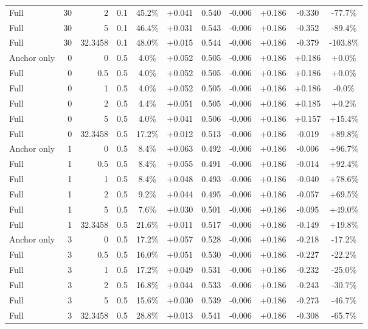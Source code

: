 \begin{table}[htbp]
\begin{tabular}{lrrrccccccc}
Full & 30 & 2 & 0.1 & 45.2\% & +0.041 & 0.540 & -0.006 & +0.186 & -0.330 & -77.7\% \\
Full & 30 & 5 & 0.1 & 46.4\% & +0.031 & 0.543 & -0.006 & +0.186 & -0.352 & -89.4\% \\
Full & 30 & 32.3458 & 0.1 & 48.0\% & +0.015 & 0.544 & -0.006 & +0.186 & -0.379 & -103.8\% \\
Anchor only & 0 & 0 & 0.5 & 4.0\% & +0.052 & 0.505 & -0.006 & +0.186 & +0.186 & +0.0\% \\
Full & 0 & 0.5 & 0.5 & 4.0\% & +0.052 & 0.505 & -0.006 & +0.186 & +0.186 & +0.0\% \\
Full & 0 & 1 & 0.5 & 4.0\% & +0.052 & 0.505 & -0.006 & +0.186 & +0.186 & -0.0\% \\
Full & 0 & 2 & 0.5 & 4.4\% & +0.051 & 0.505 & -0.006 & +0.186 & +0.185 & +0.2\% \\
Full & 0 & 5 & 0.5 & 4.0\% & +0.041 & 0.506 & -0.006 & +0.186 & +0.157 & +15.4\% \\
Full & 0 & 32.3458 & 0.5 & 17.2\% & +0.012 & 0.513 & -0.006 & +0.186 & -0.019 & +89.8\% \\
Anchor only & 1 & 0 & 0.5 & 8.4\% & +0.063 & 0.492 & -0.006 & +0.186 & -0.006 & +96.7\% \\
Full & 1 & 0.5 & 0.5 & 8.4\% & +0.055 & 0.491 & -0.006 & +0.186 & -0.014 & +92.4\% \\
Full & 1 & 1 & 0.5 & 8.4\% & +0.048 & 0.493 & -0.006 & +0.186 & -0.040 & +78.6\% \\
Full & 1 & 2 & 0.5 & 9.2\% & +0.044 & 0.495 & -0.006 & +0.186 & -0.057 & +69.5\% \\
Full & 1 & 5 & 0.5 & 7.6\% & +0.030 & 0.501 & -0.006 & +0.186 & -0.095 & +49.0\% \\
Full & 1 & 32.3458 & 0.5 & 21.6\% & +0.011 & 0.517 & -0.006 & +0.186 & -0.149 & +19.8\% \\
Anchor only & 3 & 0 & 0.5 & 17.2\% & +0.057 & 0.528 & -0.006 & +0.186 & -0.218 & -17.2\% \\
Full & 3 & 0.5 & 0.5 & 16.0\% & +0.051 & 0.530 & -0.006 & +0.186 & -0.227 & -22.2\% \\
Full & 3 & 1 & 0.5 & 17.2\% & +0.049 & 0.531 & -0.006 & +0.186 & -0.232 & -25.0\% \\
Full & 3 & 2 & 0.5 & 16.8\% & +0.044 & 0.533 & -0.006 & +0.186 & -0.243 & -30.7\% \\
Full & 3 & 5 & 0.5 & 15.6\% & +0.030 & 0.539 & -0.006 & +0.186 & -0.273 & -46.7\% \\
Full & 3 & 32.3458 & 0.5 & 28.8\% & +0.013 & 0.541 & -0.006 & +0.186 & -0.308 & -65.7\% \\

\end{tabular}
\end{table}
